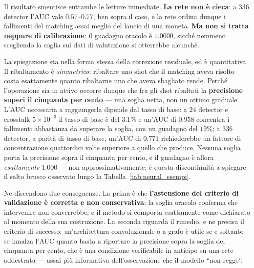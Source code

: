 Il risultato smentisce entrambe le letture immediate. \textbf{La rete non è cieca}: a $336$ detector l'\ac{AUC} vale $0.57$--$0.77$, ben sopra il caso, e la rete ordina dunque i fallimenti del matching assai meglio del lancio di una moneta. \textbf{Ma non si tratta neppure di calibrazione}: il guadagno oracolo è $1.0000$, sicché nemmeno scegliendo la soglia sui dati di valutazione si otterrebbe alcunché.

La spiegazione sta nella forma stessa della correzione residuale, ed è quantitativa. Il ribaltamento è \emph{simmetrico}: ribaltare uno shot che il matching aveva risolto costa esattamente quanto ribaltarne uno che aveva sbagliato rende. Perché l'operazione sia in attivo occorre dunque che fra gli shot ribaltati la \textbf{precisione superi il cinquanta per cento} --- una soglia netta, non un ottimo graduale. L'\ac{AUC} necessaria a raggiungerla dipende dal tasso di base: a $24$ detector e crosstalk $5\times10^{-3}$ il tasso di base è del $3.1\%$ e un'\ac{AUC} di $0.958$ concentra i fallimenti abbastanza da superare la soglia, con un guadagno del $19\%$; a $336$ detector, a parità di tasso di base, un'\ac{AUC} di $0.771$ richiederebbe un fattore di concentrazione quattordici volte superiore a quello che produce. Nessuna soglia porta la precisione sopra il cinquanta per cento, e il guadagno è allora \emph{esattamente} $1.000$ --- non approssimativamente: è questa discontinuità a spiegare il salto brusco osservato lungo la Tabella~\ref{tab:neural_esempi}.

Ne discendono due conseguenze. La prima è che \textbf{l'astensione del criterio di validazione è corretta e non conservativa}: la soglia oracolo conferma che intervenire non converrebbe, e il metodo si comporta esattamente come dichiarato al momento della sua costruzione. La seconda riguarda il rimedio, e ne precisa il criterio di successo: un'architettura convoluzionale o a grafo è utile se e soltanto se innalza l'\ac{AUC} quanto basta a riportare la precisione sopra la soglia del cinquanta per cento, che è una condizione verificabile in anticipo su una rete addestrata --- assai più informativa dell'osservazione che il modello ``non regge''.

